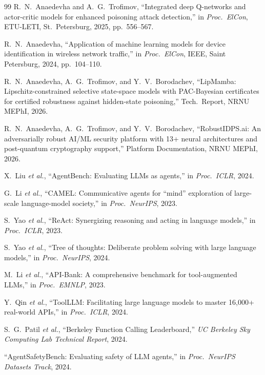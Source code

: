 \documentclass[12pt,a4paper]{article}
\theoremstyle{definition}
\theoremstyle{remark}
\begin{document}
\begin{thebibliography}{99}
R.~N.~Anaedevha and A.~G.~Trofimov, ``Integrated deep {Q}-networks and actor-critic models for enhanced poisoning attack detection,'' in \emph{Proc.\ ElCon}, ETU-LETI, St.\ Petersburg, 2025, pp.~556--567.

R.~N.~Anaedevha, ``Application of machine learning models for device identification in wireless network traffic,'' in \emph{Proc.\ ElCon}, IEEE, Saint Petersburg, 2024, pp.~104--110.

R.~N.~Anaedevha, A.~G.~Trofimov, and Y.~V.~Borodachev, ``{LipMamba}: Lipschitz-constrained selective state-space models with PAC-Bayesian certificates for certified robustness against hidden-state poisoning,'' Tech.\ Report, NRNU MEPhI, 2026.

R.~N.~Anaedevha, A.~G.~Trofimov, and Y.~V.~Borodachev, ``{RobustIDPS.ai}: An adversarially robust AI/ML security platform with 13+ neural architectures and post-quantum cryptography support,'' Platform Documentation, NRNU MEPhI, 2026.

X.~Liu \emph{et al.}, ``{AgentBench}: Evaluating LLMs as agents,'' in \emph{Proc.\ ICLR}, 2024.

G.~Li \emph{et al.}, ``{CAMEL}: Communicative agents for ``mind'' exploration of large-scale language-model society,'' in \emph{Proc.\ NeurIPS}, 2023.

S.~Yao \emph{et al.}, ``{ReAct}: Synergizing reasoning and acting in language models,'' in \emph{Proc.\ ICLR}, 2023.

S.~Yao \emph{et al.}, ``Tree of thoughts: Deliberate problem solving with large language models,'' in \emph{Proc.\ NeurIPS}, 2024.

M.~Li \emph{et al.}, ``{API-Bank}: A comprehensive benchmark for tool-augmented LLMs,'' in \emph{Proc.\ EMNLP}, 2023.

Y.~Qin \emph{et al.}, ``{ToolLLM}: Facilitating large language models to master 16{,}000+ real-world APIs,'' in \emph{Proc.\ ICLR}, 2024.

S.~G.~Patil \emph{et al.}, ``Berkeley Function Calling Leaderboard,'' \emph{UC Berkeley Sky Computing Lab Technical Report}, 2024.

``{AgentSafetyBench}: Evaluating safety of LLM agents,'' in \emph{Proc.\ NeurIPS Datasets Track}, 2024.


\end{thebibliography}
\end{document}
